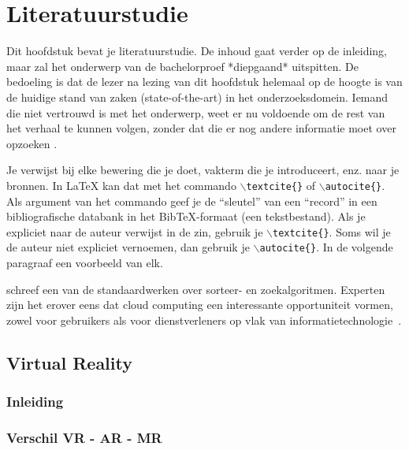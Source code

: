 \chapter{Literatuurstudie}
\label{ch:stand-van-zaken}



Dit hoofdstuk bevat je literatuurstudie. De inhoud gaat verder op de inleiding, maar zal het onderwerp van de bachelorproef *diepgaand* uitspitten. De bedoeling is dat de lezer na lezing van dit hoofdstuk helemaal op de hoogte is van de huidige stand van zaken (state-of-the-art) in het onderzoeksdomein. Iemand die niet vertrouwd is met het onderwerp, weet er nu voldoende om de rest van het verhaal te kunnen volgen, zonder dat die er nog andere informatie moet over opzoeken \autocite{Pollefliet2011}.

Je verwijst bij elke bewering die je doet, vakterm die je introduceert, enz. naar je bronnen. In \LaTeX{} kan dat met het commando \texttt{$\backslash${textcite\{\}}} of \texttt{$\backslash${autocite\{\}}}. Als argument van het commando geef je de ``sleutel'' van een ``record'' in een bibliografische databank in het Bib\TeX{}-formaat (een tekstbestand). Als je expliciet naar de auteur verwijst in de zin, gebruik je \texttt{$\backslash${}textcite\{\}}.
Soms wil je de auteur niet expliciet vernoemen, dan gebruik je \texttt{$\backslash${}autocite\{\}}. In de volgende paragraaf een voorbeeld van elk.

\textcite{Knuth1998} schreef een van de standaardwerken over sorteer- en zoekalgoritmen. Experten zijn het erover eens dat cloud computing een interessante opportuniteit vormen, zowel voor gebruikers als voor dienstverleners op vlak van informatietechnologie~\autocite{Creeger2009}.

\lipsum[7-20]
\section{Virtual Reality}

\subsection{Inleiding}
\subsection{Verschil VR - AR - MR}
